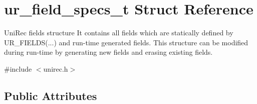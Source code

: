 \hypertarget{structur__field__specs__t}{}\section{ur\+\_\+field\+\_\+specs\+\_\+t Struct Reference}
\label{structur__field__specs__t}


Uni\+Rec fields structure It contains all fields which are statically defined by U\+R\+\_\+\+F\+I\+E\+L\+DS(...) and run-\/time generated fields. This structure can be modified during run-\/time by generating new fields and erasing existing fields.  




{\ttfamily \#include $<$unirec.\+h$>$}

\subsection*{Public Attributes}
